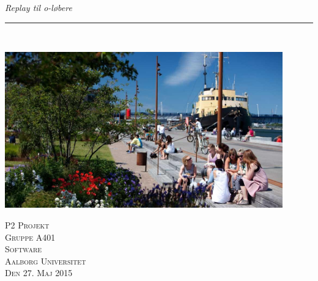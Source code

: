 \thispagestyle{empty}
\begin{flushright}
\vspace{3cm}

\phantom{hul}

\phantom{hul}

\phantom{hul}

\textsl{\Huge Replay til o-løbere} \\ \vspace{1cm}

\rule{13cm}{3mm} \\ \vspace{1.5cm}
\vspace{1cm}

\includegraphics[width=0.90\textwidth]{billeder/aalborghavnefront}
\vspace{4cm}

\vspace{2cm} 
\textsc{\Large P2 Projekt \\
Gruppe A401 \\
Software\\
Aalborg Universitet\\
Den 27. Maj 2015\\}
\end{flushright}
